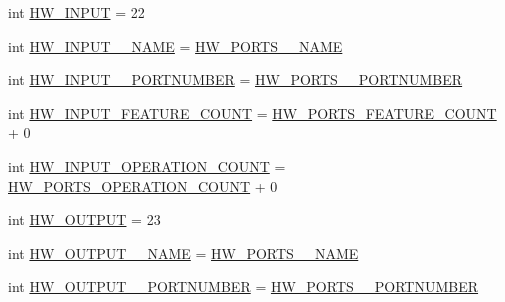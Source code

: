\begin{DoxyCompactItemize}
\item 
int \hyperlink{interfaceshootingmachineemfmodel_1_1_shootingmachineemfmodel_package_ac939588ce4eb2f893f81c08e82d43c06}{H\-W\-\_\-\-I\-N\-P\-U\-T} = 22
\item 
int \hyperlink{interfaceshootingmachineemfmodel_1_1_shootingmachineemfmodel_package_aca3df42c3daea63181ee2a2aa5ed1fac}{H\-W\-\_\-\-I\-N\-P\-U\-T\-\_\-\-\_\-\-N\-A\-M\-E} = \hyperlink{interfaceshootingmachineemfmodel_1_1_shootingmachineemfmodel_package_a8c7830b95625a0ce6a38f99f0bbb4a6f}{H\-W\-\_\-\-P\-O\-R\-T\-S\-\_\-\-\_\-\-N\-A\-M\-E}
\item 
int \hyperlink{interfaceshootingmachineemfmodel_1_1_shootingmachineemfmodel_package_ac54ab200e6b01aa749998ba59d67d36b}{H\-W\-\_\-\-I\-N\-P\-U\-T\-\_\-\-\_\-\-P\-O\-R\-T\-N\-U\-M\-B\-E\-R} = \hyperlink{interfaceshootingmachineemfmodel_1_1_shootingmachineemfmodel_package_af1a55b03e332449551c73de215f7cbbf}{H\-W\-\_\-\-P\-O\-R\-T\-S\-\_\-\-\_\-\-P\-O\-R\-T\-N\-U\-M\-B\-E\-R}
\item 
int \hyperlink{interfaceshootingmachineemfmodel_1_1_shootingmachineemfmodel_package_a535000a6deb669d11da173c3d44815a2}{H\-W\-\_\-\-I\-N\-P\-U\-T\-\_\-\-F\-E\-A\-T\-U\-R\-E\-\_\-\-C\-O\-U\-N\-T} = \hyperlink{interfaceshootingmachineemfmodel_1_1_shootingmachineemfmodel_package_a07e6faf7371ad8351da3b4600954f204}{H\-W\-\_\-\-P\-O\-R\-T\-S\-\_\-\-F\-E\-A\-T\-U\-R\-E\-\_\-\-C\-O\-U\-N\-T} + 0
\item 
int \hyperlink{interfaceshootingmachineemfmodel_1_1_shootingmachineemfmodel_package_af19839a18788f1df9c7076b1f331b660}{H\-W\-\_\-\-I\-N\-P\-U\-T\-\_\-\-O\-P\-E\-R\-A\-T\-I\-O\-N\-\_\-\-C\-O\-U\-N\-T} = \hyperlink{interfaceshootingmachineemfmodel_1_1_shootingmachineemfmodel_package_a5f85f99a2b80ea1b9f8c81dc620e69b3}{H\-W\-\_\-\-P\-O\-R\-T\-S\-\_\-\-O\-P\-E\-R\-A\-T\-I\-O\-N\-\_\-\-C\-O\-U\-N\-T} + 0
\item 
int \hyperlink{interfaceshootingmachineemfmodel_1_1_shootingmachineemfmodel_package_a4bae4f84bd29c449d0339215d739b21b}{H\-W\-\_\-\-O\-U\-T\-P\-U\-T} = 23
\item 
int \hyperlink{interfaceshootingmachineemfmodel_1_1_shootingmachineemfmodel_package_a82c44c284e4ef61163abe3704089bfad}{H\-W\-\_\-\-O\-U\-T\-P\-U\-T\-\_\-\-\_\-\-N\-A\-M\-E} = \hyperlink{interfaceshootingmachineemfmodel_1_1_shootingmachineemfmodel_package_a8c7830b95625a0ce6a38f99f0bbb4a6f}{H\-W\-\_\-\-P\-O\-R\-T\-S\-\_\-\-\_\-\-N\-A\-M\-E}
\item 
int \hyperlink{interfaceshootingmachineemfmodel_1_1_shootingmachineemfmodel_package_a2407c3a47af8c06cbb4aabb70268949d}{H\-W\-\_\-\-O\-U\-T\-P\-U\-T\-\_\-\-\_\-\-P\-O\-R\-T\-N\-U\-M\-B\-E\-R} = \hyperlink{interfaceshootingmachineemfmodel_1_1_shootingmachineemfmodel_package_af1a55b03e332449551c73de215f7cbbf}{H\-W\-\_\-\-P\-O\-R\-T\-S\-\_\-\-\_\-\-P\-O\-R\-T\-N\-U\-M\-B\-E\-R}

\end{DoxyCompactItemize}

